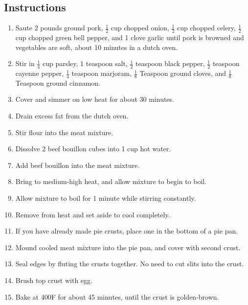 \begin{multicols}{2}
\subsection*{Instructions}
\begin{enumerate}
    \item Saute 2 pounds ground pork, \( \frac{1}{2} \) cup chopped onion, \( \frac{1}{2} \) cup chopped celery, \( \frac{1}{2} \) cup chopped green bell pepper, and 1 clove garlic until pork is browned and vegetables are soft, about 10 minutes in a dutch oven.
    \item Stir in \( \frac{1}{4} \) cup parsley, 1 teaspoon salt, \( \frac{1}{2} \) teaspoon black pepper, \( \frac{1}{2} \) teaspoon cayenne pepper, \( \frac{1}{4} \) teaspoon marjoram, \( \frac{1}{8} \) Teaspoon ground cloves, and \( \frac{1}{8} \) Teaspoon ground cinnamon.
    \item Cover and simmer on low heat for about 30 minutes.
    \item Drain excess fat from the dutch oven.
    \item Stir flour into the meat mixture.
    \item Dissolve 2 beef bouillon cubes into 1 cup hot water.
    \item Add beef bouillon into the meat mixture.
    \item Bring to medium-high heat, and allow mixture to begin to boil.
    \item Allow mixture to boil for 1 minute while stirring constantly.
    \item Remove from heat and set aside to cool completely.
    \item If you have already made pie crusts, place one in the bottom of a pie pan.
    \item Mound cooled meat mixture into the pie pan, and cover with second crust.
    \item Seal edges by fluting the crusts together. No need to cut slits into the crust.
    \item Brush top crust with egg.
    \item Bake at 400F for about 45 minutes, until the crust is golden-brown.
\end{enumerate}


\end{multicols}
